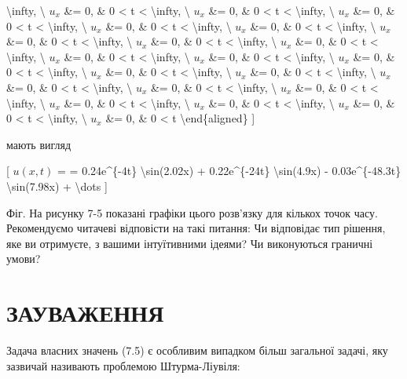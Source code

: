 \documentclass[
]{article}
\begin{document}
{{\textbackslash infty, \textbackslash{} \(u_x\) \&= 0, \& 0 \textless{} t
\textless{} \textbackslash infty, \textbackslash{} \(u_x\) \&= 0, \& 0
\textless{} t \textless{} \textbackslash infty, \textbackslash{} \(u_x\)
\&= 0, \& 0 \textless{} t \textless{} \textbackslash infty,
\textbackslash{} \(u_x\) \&= 0, \& 0 \textless{} t \textless{}
\textbackslash infty, \textbackslash{} \(u_x\) \&= 0, \& 0 \textless{} t
\textless{} \textbackslash infty, \textbackslash{} \(u_x\) \&= 0, \& 0
\textless{} t \textless{} \textbackslash infty, \textbackslash{} \(u_x\)
\&= 0, \& 0 \textless{} t \textless{} \textbackslash infty,
\textbackslash{} \(u_x\) \&= 0, \& 0 \textless{} t \textless{}
\textbackslash infty, \textbackslash{} \(u_x\) \&= 0, \& 0 \textless{} t
\textless{} \textbackslash infty, \textbackslash{} \(u_x\) \&= 0, \& 0
\textless{} t \textless{} \textbackslash infty, \textbackslash{} \(u_x\)
\&= 0, \& 0 \textless{} t \textless{} \textbackslash infty,
\textbackslash{} \(u_x\) \&= 0, \& 0 \textless{} t \textless{}
\textbackslash infty, \textbackslash{} \(u_x\) \&= 0, \& 0 \textless{} t
\textless{} \textbackslash infty, \textbackslash{} \(u_x\) \&= 0, \& 0
\textless{} t \textless{} \textbackslash infty, \textbackslash{} \(u_x\)
\&= 0, \& 0 \textless{} t \textless{} \textbackslash infty,
\textbackslash{} \(u_x\) \&= 0, \& 0 \textless{} t \textless{}
\textbackslash infty, \textbackslash{} \(u_x\) \&= 0, \& 0 \textless{} t
\textless{} \textbackslash infty, \textbackslash{} \(u_x\) \&= 0, \& 0
\textless{} t \textless{} \textbackslash infty, \textbackslash{} \(u_x\)
\&= 0, \& 0 \textless{} t \textless{} \textbackslash infty,
\textbackslash{} \(u_x\) \&= 0, \& 0 \textless{} t
\textbackslash end\{aligned\} {]}

мають вигляд

{[} \(u(x, t)\) = = 0.24e\^{}\{-4t\} \textbackslash sin(2.02x) +
0.22e\^{}\{-24t\} \textbackslash sin(4.9x) - 0.03e\^{}\{-48.3t\}
\textbackslash sin(7.98x) + \textbackslash dots {]}

Фіг. На рисунку 7-5 показані графіки цього розв'язку для кількох точок
часу. Рекомендуємо читачеві відповісти на такі питання: Чи відповідає
тип рішення, яке ви отримуєте, з вашими інтуїтивними ідеями? Чи
виконуються граничні умови?

\section{ЗАУВАЖЕННЯ}\label{ux437ux430ux443ux432ux430ux436ux435ux43dux43dux44f-3}

Задача власних значень (7.5) є особливим випадком більш загальної
задачі, яку зазвичай називають проблемою Штурма-Ліувіля:

}}
\end{document}
